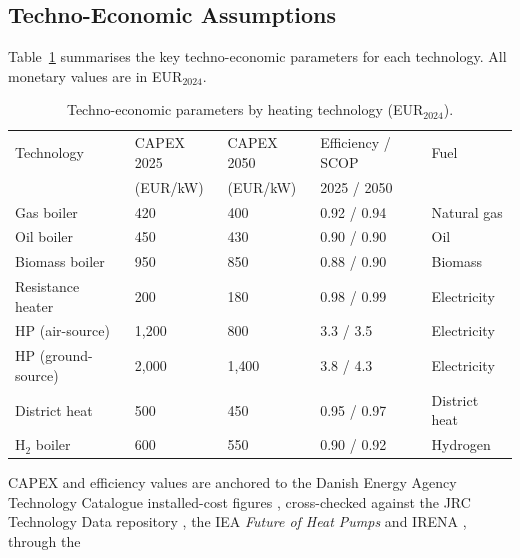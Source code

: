 \subsection{Techno-Economic Assumptions}
\label{sec:method:techassumptions}

Table~\ref{tab:techparams} summarises the key techno-economic parameters for each
technology. All monetary values are in EUR$_{2024}$.

\begin{table}[H]
\centering
\caption{Techno-economic parameters by heating technology (EUR$_{2024}$).}
\label{tab:techparams}
\begin{tabularx}{\textwidth}{lXXXX}
\toprule
Technology & CAPEX 2025 & CAPEX 2050 & Efficiency / SCOP & Fuel \\
           & (EUR/kW)   & (EUR/kW)   & 2025 / 2050      &      \\
\midrule
Gas boiler         & 420     & 400     & 0.92 / 0.94 & Natural gas \\
Oil boiler         & 450     & 430     & 0.90 / 0.90 & Oil \\
Biomass boiler     & 950     & 850     & 0.88 / 0.90 & Biomass \\
Resistance heater  & 200     & 180     & 0.98 / 0.99 & Electricity \\
HP (air-source)    & 1{,}200 & 800     & 3.3 / 3.5   & Electricity \\
HP (ground-source) & 2{,}000 & 1{,}400 & 3.8 / 4.3   & Electricity \\
District heat      & 500     & 450     & 0.95 / 0.97 & District heat \\
H$_2$ boiler       & 600     & 550     & 0.90 / 0.92 & Hydrogen \\
\bottomrule
\end{tabularx}
\par\addvspace{8pt}
\raggedright\small
CAPEX and efficiency values are anchored to the Danish Energy Agency
Technology Catalogue installed-cost figures \citep{DEA2023technology},
cross-checked against the JRC Technology Data repository
\citep{JRC2023technology,JRC2023smallheating}, the IEA \emph{Future of Heat
Pumps} \citep{IEA2022heatpumps} and IRENA \citep{IRENA2022heatpumpcosts}, through the

\end{table}
